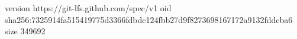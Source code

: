 version https://git-lfs.github.com/spec/v1
oid sha256:7325914fa515419775d3366fdbdc124fbb27d9f8273698167172a9132fddcba6
size 349692
